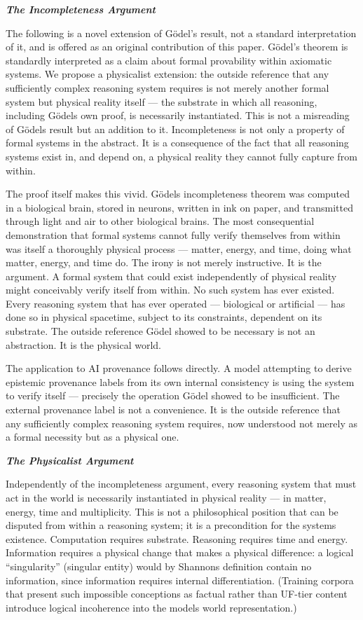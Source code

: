 \documentclass[
]{article}
\begin{document}
\emph{\textbf{The Incompleteness Argument}}

The following is a novel extension of Gödel's result, not a standard
interpretation of it, and is offered as an original contribution of this
paper. Gödel's theorem is standardly interpreted as a claim about formal
provability within axiomatic systems. We propose a physicalist
extension: the outside reference that any sufficiently complex reasoning
system requires is not merely another formal system but physical reality
itself --- the substrate in which all reasoning, including
Gödel\textquotesingle s own proof, is necessarily instantiated. This is
not a misreading of Gödel\textquotesingle s result but an addition to
it. Incompleteness is not only a property of formal systems in the
abstract. It is a consequence of the fact that all reasoning systems
exist in, and depend on, a physical reality they cannot fully capture
from within.

The proof itself makes this vivid. Gödel\textquotesingle s
incompleteness theorem was computed in a biological brain, stored in
neurons, written in ink on paper, and transmitted through light and air
to other biological brains. The most consequential demonstration that
formal systems cannot fully verify themselves from within was itself a
thoroughly physical process --- matter, energy, and time, doing what
matter, energy, and time do. The irony is not merely instructive. It is
the argument. A formal system that could exist independently of physical
reality might conceivably verify itself from within. No such system has
ever existed. Every reasoning system that has ever operated ---
biological or artificial --- has done so in physical spacetime, subject
to its constraints, dependent on its substrate. The outside reference
Gödel showed to be necessary is not an abstraction. It is the physical
world.

The application to AI provenance follows directly. A model attempting to
derive epistemic provenance labels from its own internal consistency is
using the system to verify itself --- precisely the operation Gödel
showed to be insufficient. The external provenance label is not a
convenience. It is the outside reference that any sufficiently complex
reasoning system requires, now understood not merely as a formal
necessity but as a physical one.

\emph{\textbf{The Physicalist Argument}}

Independently of the incompleteness argument, every reasoning system
that must act in the world is necessarily instantiated in physical
reality --- in matter, energy, time and multiplicity. This is not a
philosophical position that can be disputed from within a reasoning
system; it is a precondition for the system\textquotesingle s existence.
Computation requires substrate. Reasoning requires time and energy.
Information requires a physical change that makes a physical difference:
a logical ``singularity'' (singular entity) would by
Shannon\textquotesingle s definition contain no information, since
information requires internal differentiation. (Training corpora that
present such impossible conceptions as factual rather than UF-tier
content introduce logical incoherence into the model\textquotesingle s
world representation.)
\end{document}
